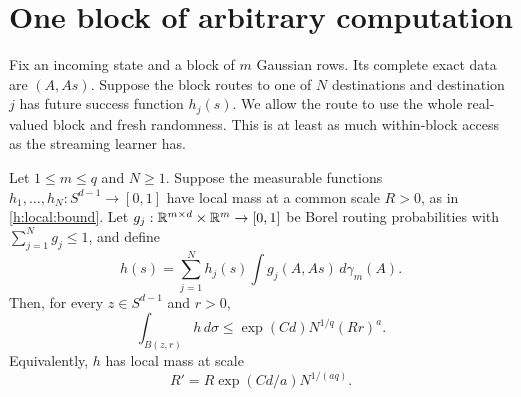 \section{One block of arbitrary computation}\label{h:blocks}

Fix an incoming state and a block of \(m\) Gaussian rows. Its complete
exact data are \((A,As)\). Suppose the block routes to one of \(N\)
destinations and destination \(j\) has future success function
\(h_j(s)\). We allow the route to use the whole real-valued block and
fresh randomness. This is at least as much within-block access as the
streaming learner has.

\begin{lemma}\label{h:block:bound}
Let \(1\le m\le q\) and \(N\ge1\). Suppose the measurable functions
\(h_1,\ldots,h_N:S^{d-1}\to[0,1]\) have local mass at a common
scale \(R>0\), as in \eqref{h:local:bound}. Let
\(g_j:\mathbb R^{m\times d}\times\mathbb R^m\to[0,1]\) be Borel routing
probabilities with \(\sum_{j=1}^N g_j\le1\), and define
\[
 h(s)=\sum_{j=1}^N h_j(s)\int g_j(A,As)\,d\gamma_m(A).
\]
Then, for every \(z\in S^{d-1}\) and \(r>0\),
\begin{equation}\label{h:block:mass}
 \int_{B(z,r)}h\,d\sigma
 \le\exp(Cd)N^{1/q}(Rr)^a.
\end{equation}
Equivalently, \(h\) has local mass at scale
\begin{equation}\label{h:block:scale}
 R'=R\exp(Cd/a)N^{1/(aq)}.
\end{equation}
\end{lemma}

